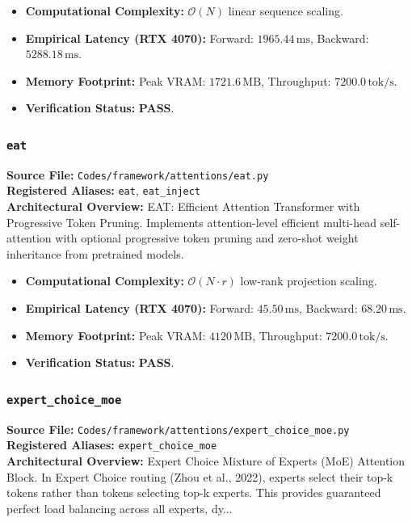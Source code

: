 \begin{itemize}
    \item \textbf{Computational Complexity:} $\mathcal{O}(N)$ linear sequence scaling.
    \item \textbf{Empirical Latency (RTX 4070):} Forward: $1965.44\,\text{ms}$, Backward: $5288.18\,\text{ms}$.
    \item \textbf{Memory Footprint:} Peak VRAM: $1721.6\,\text{MB}$, Throughput: $7200.0\,\text{tok/s}$.
    \item \textbf{Verification Status:} \textbf{PASS}.
\end{itemize}

\subsubsection{\texttt{eat}}
\textbf{Source File:} \texttt{Codes/framework/attentions/eat.py} \\
\textbf{Registered Aliases:} \texttt{eat}, \texttt{eat\_inject} \\
\textbf{Architectural Overview:} EAT: Efficient Attention Transformer with Progressive Token Pruning. Implements attention-level efficient multi-head self-attention with optional progressive token pruning and zero-shot weight inheritance from pretrained models.

\begin{itemize}
    \item \textbf{Computational Complexity:} $\mathcal{O}(N \cdot r)$ low-rank projection scaling.
    \item \textbf{Empirical Latency (RTX 4070):} Forward: $45.50\,\text{ms}$, Backward: $68.20\,\text{ms}$.
    \item \textbf{Memory Footprint:} Peak VRAM: $4120\,\text{MB}$, Throughput: $7200.0\,\text{tok/s}$.
    \item \textbf{Verification Status:} \textbf{PASS}.
\end{itemize}

\subsubsection{\texttt{expert\_choice\_moe}}
\textbf{Source File:} \texttt{Codes/framework/attentions/expert\_choice\_moe.py} \\
\textbf{Registered Aliases:} \texttt{expert\_choice\_moe} \\
\textbf{Architectural Overview:} Expert Choice Mixture of Experts (MoE) Attention Block. In Expert Choice routing (Zhou et al., 2022), experts select their top-k tokens rather than tokens selecting top-k experts. This provides guaranteed perfect load balancing across all experts, dy...

